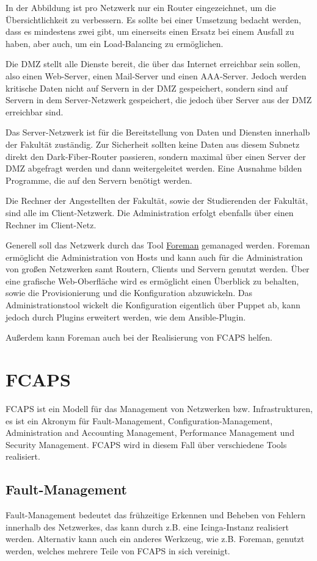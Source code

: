 In der Abbildung ist pro Netzwerk nur ein Router eingezeichnet, um die Übersichtlichkeit zu verbessern. Es sollte bei einer Umsetzung bedacht werden, dass es mindestens zwei gibt, um einerseits einen Ersatz bei einem Ausfall zu haben, aber auch, um  ein Load-Balancing zu ermöglichen.

Die DMZ stellt alle Dienste bereit, die über das Internet erreichbar sein sollen, also einen Web-Server, einen Mail-Server und einen AAA-Server. Jedoch werden kritische Daten nicht auf Servern in der DMZ gespeichert, sondern sind auf Servern in dem Server-Netzwerk gespeichert, die jedoch über Server aus der DMZ erreichbar sind.

Das Server-Netzwerk ist für die Bereitstellung von Daten und Diensten innerhalb der Fakultät zuständig. Zur Sicherheit sollten keine Daten aus diesem Subnetz direkt den Dark-Fiber-Router passieren, sondern maximal über einen Server der DMZ abgefragt werden und dann weitergeleitet werden. Eine Ausnahme bilden Programme, die auf den Servern benötigt werden.

Die Rechner der Angestellten der Fakultät, sowie der Studierenden der Fakultät, sind alle im Client-Netzwerk. Die Administration erfolgt ebenfalls über einen Rechner im Client-Netz.

Generell soll das Netzwerk durch das Tool \href{www.theforeman.org}{Foreman} gemanaged werden. Foreman ermöglicht die Administration von Hosts und kann auch für die Administration von großen Netzwerken samt Routern, Clients und Servern genutzt werden. Über eine grafische Web-Oberfläche wird es ermöglicht einen Überblick zu behalten, sowie die Provisionierung und die Konfiguration abzuwickeln.
Das Administrationstool wickelt die Konfiguration eigentlich über Puppet ab, kann jedoch durch Plugins erweitert werden, wie dem Ansible-Plugin. 

Außerdem kann Foreman auch bei der Realisierung von FCAPS helfen.

\section{FCAPS}
FCAPS ist ein Modell für das Management von Netzwerken bzw. Infrastrukturen, es ist ein Akronym für Fault-Management, Configuration-Management, Administration and Accounting Management, Performance Management und Security Management. FCAPS wird in diesem Fall über verschiedene Tools realisiert.


\subsection{Fault-Management}
Fault-Management bedeutet das frühzeitige Erkennen und Beheben von Fehlern innerhalb des Netzwerkes, das kann durch z.B. eine Icinga-Instanz realisiert werden. Alternativ kann auch ein anderes Werkzeug, wie z.B. Foreman, genutzt werden, welches mehrere Teile von FCAPS in sich vereinigt.

